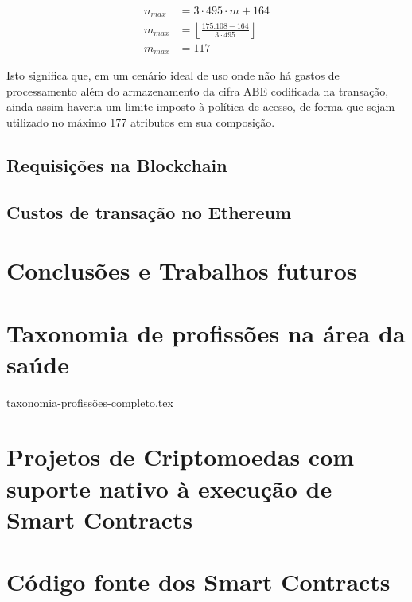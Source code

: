\documentclass[a4paper,11pt]{article}
\begin{document}
\begin{equation}
  \begin{aligned}
    n_{max} & = 3 \cdot 495 \cdot m + 164 \\
    m_{max} & = \left\lfloor \frac{175.108 - 164}{3 \cdot 495} \right\rfloor \\
    m_{max} & = 117
  \end{aligned}
\end{equation}

Isto significa que, em um cenário ideal de uso onde não há gastos de processamento além do armazenamento da cifra ABE codificada na transação, ainda assim haveria um limite imposto à política de acesso, de forma que sejam utilizado no máximo 177 atributos em sua composição.



\subsection{Requisições na Blockchain}
\label{sec:sub:experimento-requisicoes}

\subsection{Custos de transação no Ethereum}
\label{sec:sub:experimento-custos}

\newpage
\section{Conclusões e Trabalhos futuros}




\appendix
\section{Taxonomia de profissões na área da saúde}
\label{app:taxonomiaProfissões}

{taxonomia-profissões-completo.tex}

\newpage
\section{Projetos de Criptomoedas com suporte nativo à execução de Smart Contracts}
\label{app:outrasCriptomoedasSmartContracts}

\newpage
\section{Código fonte dos Smart Contracts}
\label{app:codigoSmartContracts}
\end{document}
